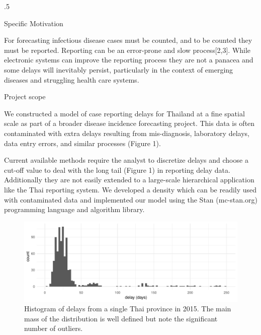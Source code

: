 \documentclass[final]{beamer}
\newlength{\onecolwid}
\begin{document}
\begin{frame}[t]
\begin{columns}[t]
\begin{column}{.5\onecolwid}
\begin{block}{Specific Motivation}
\vspace{0.2in}

For forecasting infectious disease cases must be counted, and to be counted they must be reported.  Reporting can be an error-prone and slow process[2,3].  While electronic systems can improve the reporting process they are not a panacea and some delays will inevitably persist, particularly in the context of emerging diseases and struggling health care systems.

\end{block}

\begin{block}{Project scope}

We constructed a model of case reporting delays for Thailand at a fine spatial scale as part of a broader disease incidence forecasting project.  This data is often contaminated with extra delays resulting from mis-diagnosis, laboratory delays, data entry errors, and similar processes (Figure 1).

Current available methods require the analyst to discretize delays and choose a cut-off value to deal with the long tail (Figure 1) in reporting delay data. Additionally they are not easily extended to a large-scale hierarchical application like the Thai reporting system.  We developed a density which can be readily used with contaminated data and implemented our model using the Stan (mc-stan.org) programming language and algorithm library.

\vspace{0.2in}

\begin{figure}
 \begin{center}
    \includegraphics[width=1 \textwidth]{delay-contamination}
 \end{center}
 \caption{\small Histogram of delays from a single Thai province in 2015.  The main mass of the distribution is well defined but note the significant number of outliers.}
\end{figure}


\end{block}
\end{column}
\end{columns}
\end{frame}
\end{document}
